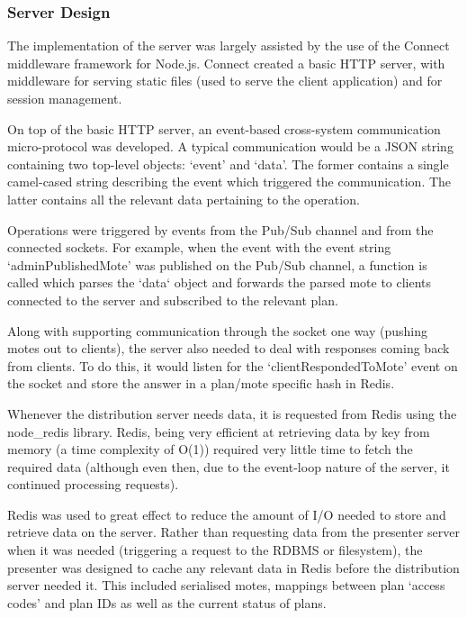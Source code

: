 \documentclass[a4papert,11pt,notitlepage]{ltxdoc}
\begin{document}

\subsubsection{Server Design}
The implementation of the server was largely assisted by the use of the Connect middleware framework for Node.js. Connect created a basic HTTP server, with middleware for serving static files (used to serve the client application) and for session management.

On top of the basic HTTP server, an event-based cross-system communication micro-protocol was developed. A typical communication would be a JSON string containing two top-level objects: `event' and `data'. The former contains a single camel-cased string describing the event which triggered the communication. The latter contains all the relevant data pertaining to the operation.

Operations were triggered by events from the Pub/Sub channel and from the connected sockets. For example, when the event  with the event string `adminPublishedMote' was published on the Pub/Sub channel, a function is called which parses the `data` object and forwards the parsed mote to clients connected to the server and subscribed to the relevant plan.

Along with supporting communication through the socket one way (pushing motes out to clients), the server also needed to deal with responses coming back from clients. To do this, it would listen for the `clientRespondedToMote' event on the socket and store the answer in a plan/mote specific hash in Redis.

Whenever the distribution server needs data, it is requested from Redis using the node\_redis\cite{noderedis:web} library. Redis, being very efficient at retrieving data by key from memory (a time complexity of O(1)) required very little time to fetch the required data (although even then, due to the event-loop nature of the server, it continued processing requests).

Redis was used to great effect to reduce the amount of I/O needed to store and retrieve data on the server. Rather than requesting data from the presenter server when it was needed (triggering a request to the RDBMS or filesystem), the presenter was designed to cache any relevant data in Redis before the distribution server needed it. This included serialised motes, mappings between plan `access codes' and plan IDs as well as the current status of plans.
\end{document}

